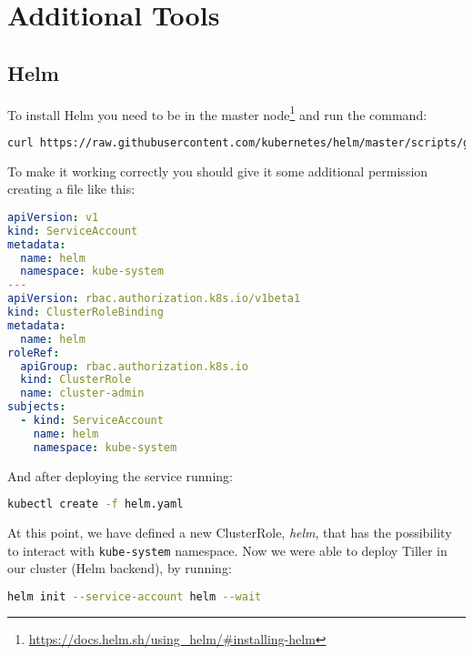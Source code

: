 \section{Additional Tools}
\label{additional-tools}

\subsection{Helm}
\label{helm}

To install Helm you need to be in the master node\footnote{
\url{https://docs.helm.sh/using_helm/\#installing-helm}} and run the
command:
\begin{lstlisting}[language=bash]
curl https://raw.githubusercontent.com/kubernetes/helm/master/scripts/get | bash
\end{lstlisting}
To make it working correctly you should give it some additional permission
creating a file like this:
\begin{lstlisting}[language=yaml]
apiVersion: v1
kind: ServiceAccount
metadata:
  name: helm
  namespace: kube-system
---
apiVersion: rbac.authorization.k8s.io/v1beta1
kind: ClusterRoleBinding
metadata:
  name: helm
roleRef:
  apiGroup: rbac.authorization.k8s.io
  kind: ClusterRole
  name: cluster-admin
subjects:
  - kind: ServiceAccount
    name: helm
    namespace: kube-system
\end{lstlisting}
And after deploying the service running:
\begin{lstlisting}[language=bash]
kubectl create -f helm.yaml
\end{lstlisting}
At this point, we have defined a new ClusterRole, \emph{helm}, that has the
possibility to interact with \texttt{kube-system} namespace. Now we were able to
deploy Tiller in our cluster (Helm backend), by running:
\begin{lstlisting}[language=bash]
 helm init --service-account helm --wait
 \end{lstlisting}
